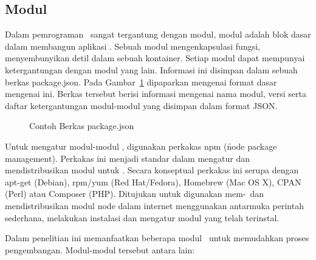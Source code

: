 \subsection{Modul \nodejs}

Dalam pemrograman \nodejs~sangat tergantung dengan modul, modul adalah blok
dasar dalam membangun aplikasi \nodejs. Sebuah modul mengenkapsulasi
fungsi, menyembunyikan detil dalam sebuah kontainer. Setiap modul dapat
mempunyai ketergantungan dengan modul yang lain. Informasi ini disimpan dalam
sebuah berkas package.json. Pada Gambar~\ref{fig:package_json} dipaparkan mengenai
format dasar mengenai ini. Berkas tersebut berisi informasi mengenai nama modul,
versi serta daftar ketergantungan modul-modul yang disimpan dalam format JSON.

\noindent
\begin{figure}
	\centering
	\lstset{basicstyle=\ttfamily,frame=single,language=javascript}
	
	\caption{Contoh Berkas package.json}
	\label{fig:package_json}
\end{figure}

Untuk mengatur modul-modul \nodejs, digunakan perkakas npm (\f{node package
	management}). Perkakas ini menjadi standar dalam mengatur dan mendistribusikan
modul untuk \nodejs. Secara konseptual perkakas ini serupa dengan apt-get
(Debian), rpm/yum (Red Hat/Fedora), Homebrew (Mac OS X), CPAN (Perl) atau
Composer (PHP). Ditujukan untuk digunakan mem-\publish~dan mendistribusikan
modul node dalam internet menggunakan antarmuka perintah sederhana, melakukan
instalasi dan mengatur modul yang telah terinstal.

Dalam penelitian ini memanfaatkan beberapa modul \nodejs~untuk memudahkan proses
pengembangan. Modul-modul tersebut antara lain:

